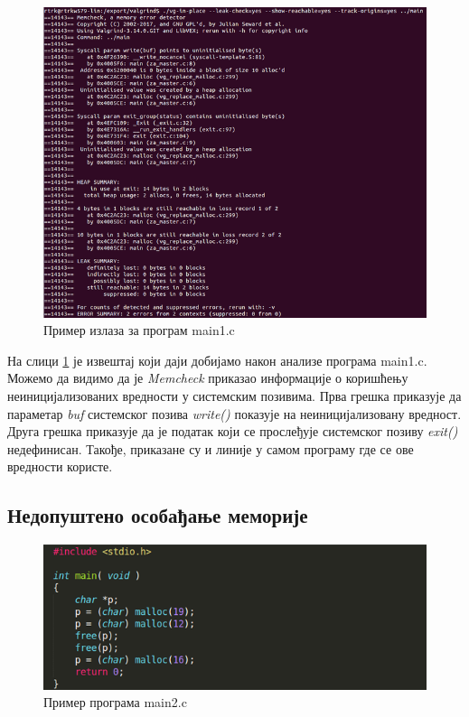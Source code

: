 \documentclass[12pt,oneside]{memoir}
\begin{document}
\begin{figure}[h!]
\begin{center}
\includegraphics[scale=0.75]{slika4.png}
\end{center}
\caption{Пример излаза за програм main1.c}
\label{fig:memcheck1}
\end{figure}

\indent На слици \ref{fig:memcheck1} је извештај који даји добијамо након анализе програма main1.c. Можемо да видимо да је \textit{Memcheck} приказао информације о коришћењу неиницијализованих вредности у системским позивима. Прва грешка приказује да параметар \textit{buf} системског позива \textit{write()} показује на неиницијализовану вредност. Друга грешка приказује да је податак који се прослеђује системског позиву \textit{exit()} недефинисан. Такође, приказане су и линије у самом програму где се ове вредности користе.

\subsection{Недопуштено особађање меморије}

\begin{figure}[h!]
\begin{center}
\includegraphics[scale=0.75]{slika5.png}
\end{center}
\caption{Пример програма main2.c}
\label{fig:main2}
\end{figure}
\end{document}
